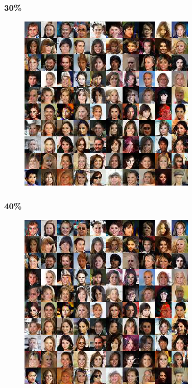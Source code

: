 \documentclass[dvipdfmx,12pt]{beamer}
\begin{document}
\begin{frame}
	\frametitle{30\%}
	\begin{figure}[htbp]
	\begin{center}
	\includegraphics[width=0.7\hsize]{./sndcgan/image00030000.png}
	\end{center}
	\end{figure}
\end{frame}
\begin{frame}
	\frametitle{40\%}
	\begin{figure}[htbp]
	\begin{center}
	\includegraphics[width=0.7\hsize]{./sndcgan/image00040000.png}
	\end{center}
	\end{figure}
\end{frame}
\end{document}
